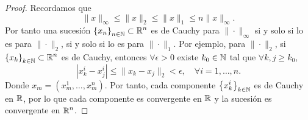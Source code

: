\begin{proof}
Recordamos que 
\[\| x \|_{\infty} \leq \| x \|_{2} \leq \| x \|_{1} \leq n \|x\|_{\infty}.\]
Por tanto una sucesión $\displaystyle \left\{ x_{n}\right\} _{n\in\mathbb{N}} \subset \mathbb{R}^{n} $ es de Cauchy para $\displaystyle \| \cdot \|_{\infty} $ si y solo si lo es para $\displaystyle \| \cdot \|_{2} $, si y solo si lo es para $\displaystyle \| \cdot \|_{1} $. Por ejemplo, para $\displaystyle \| \cdot \|_{2} $, si $\displaystyle \left\{ x_{k}\right\} _{k\in\mathbb{N}} \subset \mathbb{R}^{n} $ es de Cauchy, entonces $\displaystyle \forall \epsilon > 0 $ existe $\displaystyle k_{0} \in \mathbb{N} $ tal que $\displaystyle \forall k,j \geq k_{0} $, 
\[ \left|x^{i}_{k}-x^{i}_{j}\right| \leq \| x_{k}-x_{j}\|_{2} < \epsilon, \quad \forall i = 1, \ldots, n.\]
Donde $\displaystyle x_{m} = \left(x^{1}_{m}, \ldots, x^{n}_{m}\right) $. Por tanto, cada componente $\displaystyle \left\{ x^{i}_{k}\right\} _{k\in \mathbb{N}} $ es de Cauchy en $\displaystyle \mathbb{R} $, por lo que cada componente es convergente en $\displaystyle \mathbb{R} $ y la sucesión es convergente en $\displaystyle \mathbb{R}^{n} $.
\end{proof}
